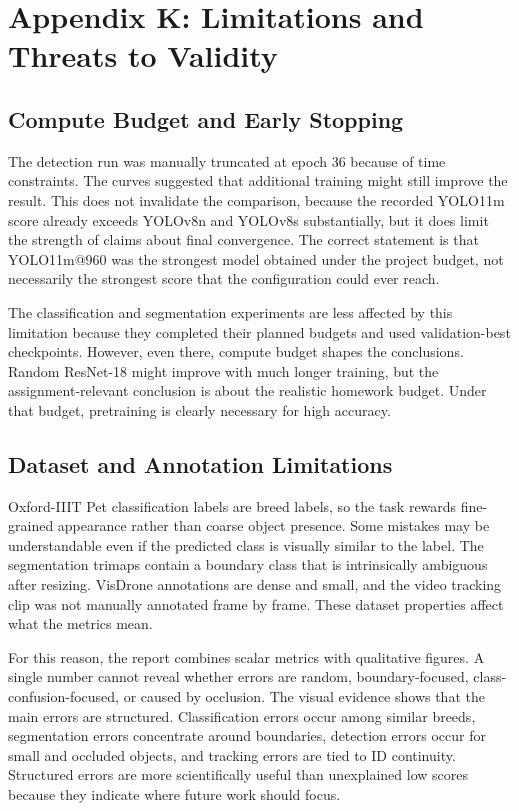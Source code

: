 \documentclass[10pt,twocolumn]{article}
\begin{document}
\section{Appendix K: Limitations and Threats to Validity}

\subsection{Compute Budget and Early Stopping}

The detection run was manually truncated at epoch 36 because of time constraints. The curves suggested that additional training might still improve the result. This does not invalidate the comparison, because the recorded YOLO11m score already exceeds YOLOv8n and YOLOv8s substantially, but it does limit the strength of claims about final convergence. The correct statement is that YOLO11m@960 was the strongest model obtained under the project budget, not necessarily the strongest score that the configuration could ever reach.

The classification and segmentation experiments are less affected by this limitation because they completed their planned budgets and used validation-best checkpoints. However, even there, compute budget shapes the conclusions. Random ResNet-18 might improve with much longer training, but the assignment-relevant conclusion is about the realistic homework budget. Under that budget, pretraining is clearly necessary for high accuracy.

\subsection{Dataset and Annotation Limitations}

Oxford-IIIT Pet classification labels are breed labels, so the task rewards fine-grained appearance rather than coarse object presence. Some mistakes may be understandable even if the predicted class is visually similar to the label. The segmentation trimaps contain a boundary class that is intrinsically ambiguous after resizing. VisDrone annotations are dense and small, and the video tracking clip was not manually annotated frame by frame. These dataset properties affect what the metrics mean.

For this reason, the report combines scalar metrics with qualitative figures. A single number cannot reveal whether errors are random, boundary-focused, class-confusion-focused, or caused by occlusion. The visual evidence shows that the main errors are structured. Classification errors occur among similar breeds, segmentation errors concentrate around boundaries, detection errors occur for small and occluded objects, and tracking errors are tied to ID continuity. Structured errors are more scientifically useful than unexplained low scores because they indicate where future work should focus.
\end{document}
